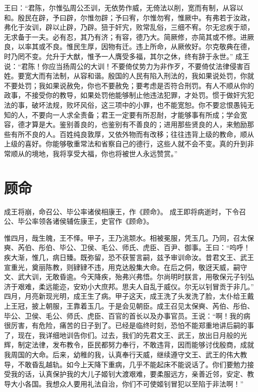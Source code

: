 \documentclass[a4paper,12pt,UTF8,twoside]{ctexbook}
\begin{document}
王曰：“君陈，尔惟弘周公丕训，无依势作威，无倚法以削，宽而有制，从容以和。殷民在辟，予曰辟，尔惟勿辟；予曰宥，尔惟勿宥，惟厥中。有弗若于汝政，弗化于汝训，辟以止辟，乃辟。狃于奸宄，败常乱俗，三细不宥。尔无忿疾于顽，无求备于一夫。必有忍，其乃有济；有容，德乃大。简厥修，亦简其或不修。进厥良，以率其或不良。惟民生厚，因物有迁。违上所命，从厥攸好。尔克敬典在德，时乃罔不变。允升于大猷，惟予一人膺受多福，其尔之休，终有辞于永世。”
成王说：“君陈！你应当扬周公的大训！不要倚仗势力为非作歹，不要倚仗法律侵害百姓。要宽大而有法制，从容和谐。殷国的人民有陷入刑法的，我如果说处罚，你就不要处罚；我如果说赦免，你也不要赦免；要考虑是否符合刑罚。有人不顺从你的政事，不接受你的教导，如果处罚他能够制止他违法犯罪，才处罚。惯于做奸宄犯法的事，破坏法规，败坏风俗，这三项中的小罪，也不能宽恕。你不要忿恨愚钝无知的人，不要向一人求全责备；君王一定要有所忍耐，才能够事有所成；学会宽容，德才算是大。鉴别善良的，也鉴别有不善良的；进用那些贤良的人，来勉励那些有所不良的人。百姓纯良敦厚，又依外物而有改移；往往违背上级的教命，顺从上级的喜好。你能够敬重常法和省察自己的德行，这些人就不会不变。真的升到非常顺从的境地，我将享受大福，你也将被世人永远赞赏。”

\chapter{顾命}

成王将崩，命召公、毕公率诸侯相康王，作《顾命》。
成王即将病逝时，下令召公、毕公率领各诸侯辅佐康王，史官作《顾命》。

惟四月，哉生魄，王不怿。甲子，王乃洮颒水。相被冕服，凭玉几。乃同，召太保奭、芮伯、彤伯、毕公、卫侯、毛公、师氏、虎臣、百尹、御事。王曰：“呜呼！疾大渐，惟几，病日臻。既弥留，恐不获誓言嗣，兹予审训命汝。昔君文王、武王宣重光，奠丽陈教，则肄肄不违，用克达殷集大命。在后之侗，敬迓天威，嗣守文、武大训，无敢昏逾。今天降疾，殆弗兴弗悟。尔尚明时朕言，用敬保元子钊弘济于艰难，柔远能迩，安劝小大庶邦。思夫人自乱于威仪。尔无以钊冒贡于非几。”
四月，月亮新现光明，成王生了病。甲子这天，成王洗了头发洗了脸，太仆给王戴上王冠，披上朝服，王靠着玉几。于是会见朝臣。成王召见太保奭、芮伯、彤伯、毕公、卫侯、毛公、师氏、虎臣、百官的首长以及办事官员。王说：“啊！我的病很厉害，有危险，痛苦的日子到了。已经是临终时刻，恐怕不能郑重地讲后嗣的事了，现在，我详细地训告你们。过去，我们的先君文王、武王，放出日月般的光辉，制定法律，发布教令，臣民都努力奉行，不敢违背，因而能够讨伐殷商，成就我周国的大命。后来，幼稚的我，认真奉行天威，继续遵守文王、武王的伟大教导，不敢昏乱越轨。如今上天降下重病，几乎不能起床不能说话了。你们要勉力接受我的话，认真保护我的大儿子姬钊大渡艰难，要柔服远方，亲善近邻，安定、教导大小各国。我想众人要用礼法自治，你们不可使姬钊冒犯以至陷于非法啊！”
\end{document}
